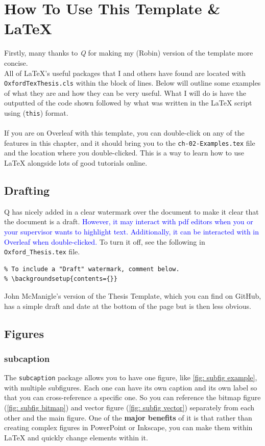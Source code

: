 \chapter{How To Use This Template \& \LaTeX}
\label{ch: Examples}

\adjustmtc
\minitoc

Firstly, many thanks to \textit{Q} for making my (Robin) version of the template more concise.\\
All of \LaTeX's useful packages that I and others have found are located with \verb|OxfordTexThesis.cls| within the  block of lines. Below will outline some examples of what they are and how they can be very useful.
What I will do is have the outputted of the code shown followed by what was written in the \LaTeX{} script using (\verb|this|) format.\\\\
If you are on Overleaf with this template, you can double-click on any of the features in this chapter, and it should bring you to the \verb|ch-02-Examples.tex| file and the location where you double-clicked. This is a way to learn how to use \LaTeX{} alongside lots of good tutorials online.

\section{Drafting}
Q has nicely added in a clear  watermark over the document to make it clear that the document is a draft.
\textcolor{blue}{However, it may interact with pdf editors when you or your supervisor wants to highlight text. Additionally, it can be interacted with in Overleaf when double-clicked.}
To turn it off, see the following in \verb|Oxford_Thesis.tex| file.
\begin{verbatim}
% To include a "Draft" watermark, comment below.
% \backgroundsetup{contents={}}    
\end{verbatim}
John McManigle's version of the Thesis Template, which you can find on GitHub, has a simple draft and date at the bottom of the page but is then less obvious.

\section{Figures}
\subsection{subcaption}
The \texttt{subcaption} package allows you to have one figure, like \cref{fig: subfig example}, with multiple subfigures. Each one can have its own caption and its own label so that you can cross-reference a specific one. So you can reference the bitmap figure (\cref{fig: subfig bitmap}) and vector figure (\cref{fig: subfig vector}) separately from each other and the main figure.
One of the \textbf{major benefits} of it is that rather than creating complex figures in PowerPoint or Inkscape, you can make them within \LaTeX{} and quickly change elements within it.

